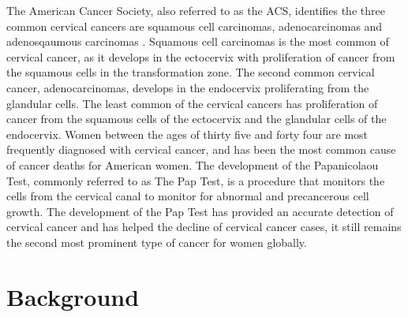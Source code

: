 \documentclass[12pt]{article}
\numberwithin{equation}{section}
\begin{document}
The American Cancer Society, also referred to as the ACS, identifies the three common cervical cancers are squamous cell carcinomas, adenocarcinomas and adenosqaumous carcinomas \cite{ACS}. Squamous cell carcinomas is the most common of cervical cancer, as it develops in the ectocervix with proliferation of cancer from the squamous cells  in the transformation zone. The second common cervical cancer, adenocarcinomas, develops in the endocervix proliferating from the glandular cells. The least common of the cervical cancers has proliferation of cancer from the squamous cells of the ectocervix and the glandular cells of the endocervix. Women between the ages of thirty five and forty four are most frequently diagnosed with cervical cancer, and has been the most common cause of cancer deaths for American women. The development of the Papanicolaou Test, commonly referred to as The Pap Test, is a procedure that monitors the cells from the cervical canal to monitor for abnormal and precancerous cell growth. The development of the Pap Test has provided an accurate detection of cervical cancer and has helped the decline of cervical cancer cases, it still remains the second most prominent type of cancer for women globally. 

\section{Background}
\end{document}
